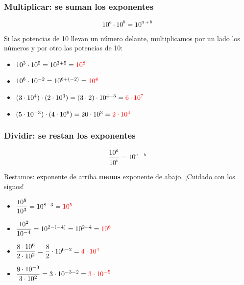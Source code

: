\subsubsection{Multiplicar: se suman los exponentes}

\begin{equation*}
    10^{a} \cdot 10^{b} = 10^{a+b}
\end{equation*}

Si las potencias de 10 llevan un número delante, multiplicamos por un lado los números y por otro las potencias de 10:

\begin{example}
    \begin{itemize}
        \item \(10^{3} \cdot 10^{5} = 10^{3+5} = \textcolor{red}{10^{8}}\)
        \item \(10^{6} \cdot 10^{-2} = 10^{6+(-2)} = \textcolor{red}{10^{4}}\)
        \item \((3 \cdot 10^{4}) \cdot (2 \cdot 10^{3}) = (3 \cdot 2) \cdot 10^{4+3} = \textcolor{red}{6 \cdot 10^{7}}\)
        \item \((5 \cdot 10^{-3}) \cdot (4 \cdot 10^{6}) = 20 \cdot 10^{3} = \textcolor{red}{2 \cdot 10^{4}}\)
    \end{itemize}
\end{example}

\subsubsection{Dividir: se restan los exponentes}

\begin{equation*}
    \dfrac{10^{a}}{10^{b}} = 10^{a-b}
\end{equation*}

Restamos: exponente de arriba \textbf{menos} exponente de abajo. ¡Cuidado con los signos!

\begin{example}
    \begin{itemize}
        \item \(\dfrac{10^{8}}{10^{3}} = 10^{8-3} = \textcolor{red}{10^{5}}\)
        \item \(\dfrac{10^{2}}{10^{-4}} = 10^{2-(-4)} = 10^{2+4} = \textcolor{red}{10^{6}}\)
        \item \(\dfrac{8 \cdot 10^{6}}{2 \cdot 10^{2}} = \dfrac{8}{2} \cdot 10^{6-2} = \textcolor{red}{4 \cdot 10^{4}}\)
        \item \(\dfrac{9 \cdot 10^{-3}}{3 \cdot 10^{2}} = 3 \cdot 10^{-3-2} = \textcolor{red}{3 \cdot 10^{-5}}\)
    \end{itemize}
\end{example}

